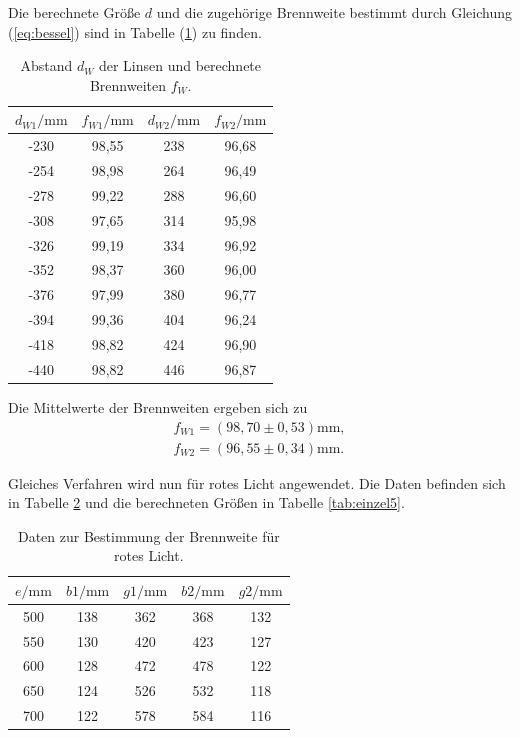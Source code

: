 Die berechnete Größe $d$ und die zugehörige Brennweite bestimmt durch Gleichung (\ref{eq:bessel}) sind in Tabelle (\ref{tab:einzel3}) zu finden.
\begin{table}[H]
\centering
\caption{Abstand $d_W$ der Linsen und berechnete Brennweiten $f_W$.}
\label{tab:einzel3}
\begin{tabular}{c c c c}
\toprule
$d_{W1}/\si{\milli\meter}$ & $f_{W1}/\si{\milli\meter}$ & $d_{W2}/\si{\milli\meter}$ & $f_{W2}/\si{\milli\meter}$ \\
\midrule
-230 & 98,55 & 238 & 96,68\\
-254 & 98,98 & 264 & 96,49\\
-278 & 99,22 & 288 & 96,60\\
-308 & 97,65 & 314 & 95,98\\
-326 & 99,19 & 334 & 96,92\\
-352 & 98,37 & 360 & 96,00\\
-376 & 97,99 & 380 & 96,77\\
-394 & 99,36 & 404 & 96,24\\
-418 & 98,82 & 424 & 96,90\\
-440 & 98,82 & 446 & 96,87\\
\bottomrule
\end{tabular}
\end{table}

Die Mittelwerte der Brennweiten ergeben sich zu
\begin{align*}
f_{W1} = (98,70 \pm 0,53) \si{\milli\meter}, \\
f_{W2} = (96,55 \pm 0,34) \si{\milli\meter} .
\end{align*}


Gleiches Verfahren wird nun für rotes Licht angewendet. Die Daten befinden sich in Tabelle \ref{tab:einzel4} und die berechneten Größen in Tabelle \ref{tab:einzel5}.


\begin{table}[H]
\centering
\caption{Daten zur Bestimmung der Brennweite für rotes Licht.}
\label{tab:einzel4}
\begin{tabular}{c c c c c}
\toprule
$e/\si{\milli\meter}$ &$b1/\si{\milli\meter}$ & $g1/\si{\milli\meter}$ & $b2/\si{\milli\meter}$ & $g2/\si{\milli\meter}$ \\
\midrule
500 &138 & 362 & 368 & 132\\
550 &130 & 420 & 423 & 127\\
600 &128 & 472 & 478 & 122\\
650 &124 & 526 & 532 & 118\\
700 &122 & 578 & 584 & 116\\
\bottomrule
\end{tabular}
\end{table}

